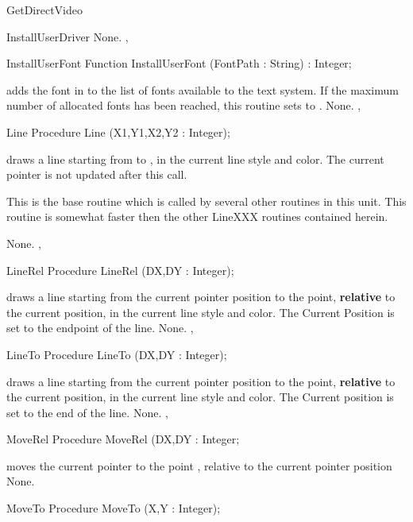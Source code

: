 \begin{function}{GetDirectVideo}
\begin{function}{InstallUserDriver}
\Errors
None.
\SeeAlso
{}, 
\end{function}
\begin{function}{InstallUserFont}
\Declaration
Function InstallUserFont (FontPath : String) : Integer;

\Description
{} adds the font in  to the list of fonts
available to the text system. If the maximum number of allocated fonts has
been reached, this routine sets  to .
\Errors
None.
\SeeAlso
{}, 
\end{function}
\begin{procedure}{Line}
\Declaration
Procedure Line (X1,Y1,X2,Y2 : Integer);

\Description
{} draws a line starting from
 to , in the current line style and color.
The current pointer is not updated after this call.

This is the base routine which is called by several other routines
in this unit. This routine is somewhat faster then the other
LineXXX routines contained herein.


\Errors
None.
\SeeAlso
{},
\end{procedure}
\begin{procedure}{LineRel}
\Declaration
Procedure LineRel (DX,DY : Integer);

\Description
{} draws a line starting from
the current pointer position to the point, \textbf{relative} to the
current position, in the current line style and color. The Current Position
is set to the endpoint of the line.
\Errors
None.
\SeeAlso
{}, 
\end{procedure}
\begin{procedure}{LineTo}
\Declaration
Procedure LineTo (DX,DY : Integer);

\Description
{} draws a line starting from
the current pointer position to the point, \textbf{relative} to the
current position, in the current line style and color. The Current position
is set to the end of the line.
\Errors
None.
\SeeAlso
{},
\end{procedure}
\begin{procedure}{MoveRel}
\Declaration
Procedure MoveRel (DX,DY : Integer;

\Description
{} moves the current pointer to the
point , relative to the current pointer
position
\Errors
None.
\SeeAlso
{}
\end{procedure}
\begin{procedure}{MoveTo}
\Declaration
Procedure MoveTo (X,Y : Integer);


\end{procedure}
\end{function}
